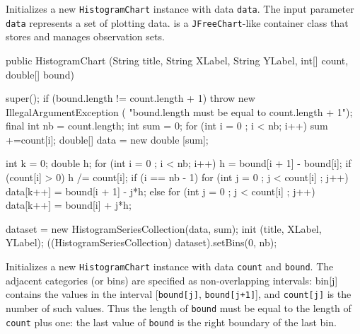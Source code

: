 \begin{tabb}
   Initializes a new \texttt{HistogramChart} instance with data \texttt{data}.
   The input parameter \texttt{data} represents a set of plotting data.
    is a
   \texttt{JFreeChart}-like container class that stores and manages
    observation sets.
\end{tabb}
\begin{htmlonly}
\end{htmlonly}
\begin{code}

    public HistogramChart (String title, String XLabel, String YLabel,
                           int[] count, double[] bound) \begin{hide} {
      super();
      if (bound.length != count.length + 1)
         throw new IllegalArgumentException (
            "bound.length must be equal to count.length + 1");
      final int nb = count.length;
      int sum = 0;
      for (int i = 0 ; i < nb; i++) sum +=count[i];
      double[] data = new double [sum];

      int k = 0;
      double h;
      for (int i = 0 ; i < nb; i++) {
         h = bound[i + 1] - bound[i];
         if (count[i] > 0)
            h /= count[i];
         if (i == nb - 1) {
            for (int j = 0 ; j < count[i] ; j++)
               data[k++] = bound[i + 1] - j*h;
         } else {
            for (int j = 0 ; j < count[i] ; j++)
               data[k++] = bound[i] + j*h;
         }
      }

      dataset = new HistogramSeriesCollection(data, sum);
      init (title, XLabel, YLabel);
      ((HistogramSeriesCollection) dataset).setBins(0, nb);
   }\end{hide}
\end{code}
\begin{tabb}
   Initializes a new \texttt{HistogramChart} instance with data \texttt{count}
   and \texttt{bound}. The adjacent categories (or bins) are specified as
   non-overlapping intervals: bin[j] contains the values in the interval
   [\texttt{bound[j]}, \texttt{bound[j+1]}], and \texttt{count[j]} is the
   number of such values. %
   Thus the length of \texttt{bound} must be equal to
   the length of \texttt{count} plus one: the last value of \texttt{bound}
   is the right boundary of the last bin.
\end{tabb}
